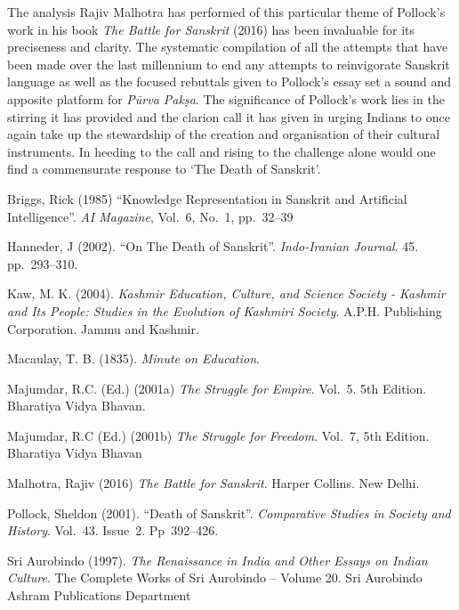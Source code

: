 The analysis Rajiv Malhotra has performed of this particular theme of Pollock’s work in his book {\sl The Battle for Sanskrit} (2016) has been invaluable for its preciseness and clarity. The systematic compilation of all the attempts that have been made over the last millennium to end any attempts to reinvigorate Sanskrit language as well as the focused rebuttals given to Pollock’s essay set a sound and apposite platform for {\sl Pūrva Pakṣa}. The significance of Pollock’s work lies in the stirring it has provided and the clarion call it has given in urging Indians to once again take up the stewardship of the creation and organisation of their cultural instruments. In heeding to the call and rising to the challenge alone would one find a commensurate response to ‘The Death of Sanskrit’.
\newpage

\begin{thebibliography}{99}
Briggs, Rick (1985) “Knowledge Representation in Sanskrit and Artificial Intelligence”. {\sl AI Magazine}, Vol.~6, No.~1, pp.~32--39

Hanneder, J (2002). “On The Death of Sanskrit”. {\sl Indo-Iranian Journal}. 45. pp.~293--310.

Kaw, M. K. (2004). {\sl Kashmir Education, Culture, and Science Society - Kashmir and Its People: Studies in the Evolution of Kashmiri Society}. A.P.H. 
Publishing Corporation. Jammu and Kashmir.  

Macaulay, T. B. (1835). {\sl Minute on Education}.

Majumdar, R.C. (Ed.) (2001a) {\sl The Struggle for Empire}. Vol.~5. 5th Edition. Bharatiya Vidya Bhavan. 

Majumdar, R.C (Ed.) (2001b) {\sl The Struggle for Freedom}. Vol.~7, 5th Edition. Bharatiya Vidya Bhavan

Malhotra, Rajiv (2016) {\sl The Battle for Sanskrit}. Harper Collins. New Delhi.

Pollock, Sheldon (2001). “Death of Sanskrit”. {\sl Comparative Studies in Society and History}. Vol.~43. Issue~2. Pp~392--426. 

Sri Aurobindo (1997). {\sl The Renaissance in India and Other Essays on Indian Culture}. The Complete Works of Sri Aurobindo – Volume 20. Sri Aurobindo 
Ashram Publications Department

\end{thebibliography}
